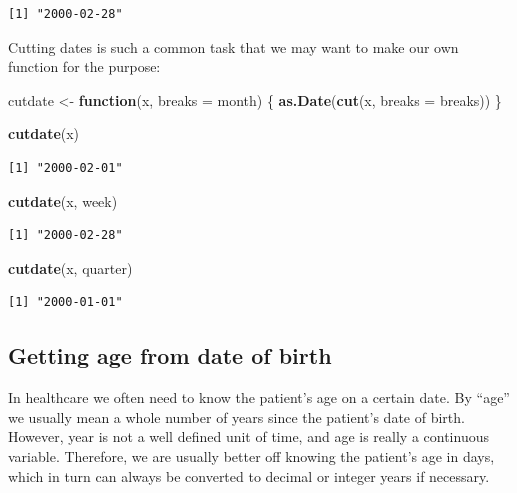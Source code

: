 \documentclass[
]{book}
\newenvironment{Shaded}{\begin{snugshade}}{\end{snugshade}}
\newcommand{\AttributeTok}[1]{\textcolor[rgb]{0.13,0.29,0.53}{#1}}
\newcommand{\ControlFlowTok}[1]{\textcolor[rgb]{0.13,0.29,0.53}{\textbf{#1}}}
\newcommand{\FunctionTok}[1]{\textcolor[rgb]{0.13,0.29,0.53}{\textbf{#1}}}
\newcommand{\NormalTok}[1]{#1}
\newcommand{\OtherTok}[1]{\textcolor[rgb]{0.56,0.35,0.01}{#1}}
\newcommand{\StringTok}[1]{\textcolor[rgb]{0.31,0.60,0.02}{#1}}
\begin{document}
\begin{verbatim}
[1] "2000-02-28"
\end{verbatim}

Cutting dates is such a common task that we may want to make our own function for the purpose:

\begin{Shaded}
\begin{Highlighting}[]
\NormalTok{cutdate }\OtherTok{\textless{}{-}} \ControlFlowTok{function}\NormalTok{(x, }\AttributeTok{breaks =} \StringTok{\textquotesingle{}month\textquotesingle{}}\NormalTok{) \{}
  \FunctionTok{as.Date}\NormalTok{(}\FunctionTok{cut}\NormalTok{(x, }\AttributeTok{breaks =}\NormalTok{ breaks))}
\NormalTok{\}}

\FunctionTok{cutdate}\NormalTok{(x)}
\end{Highlighting}
\end{Shaded}

\begin{verbatim}
[1] "2000-02-01"
\end{verbatim}

\begin{Shaded}
\begin{Highlighting}[]
\FunctionTok{cutdate}\NormalTok{(x, }\StringTok{\textquotesingle{}week\textquotesingle{}}\NormalTok{)}
\end{Highlighting}
\end{Shaded}

\begin{verbatim}
[1] "2000-02-28"
\end{verbatim}

\begin{Shaded}
\begin{Highlighting}[]
\FunctionTok{cutdate}\NormalTok{(x, }\StringTok{\textquotesingle{}quarter\textquotesingle{}}\NormalTok{)}
\end{Highlighting}
\end{Shaded}

\begin{verbatim}
[1] "2000-01-01"
\end{verbatim}

\subsection{Getting age from date of birth}\label{getting-age-from-date-of-birth}

In healthcare we often need to know the patient's age on a certain date. By ``age'' we usually mean a whole number of years since the patient's date of birth. However, year is not a well defined unit of time, and age is really a continuous variable. Therefore, we are usually better off knowing the patient's age in days, which in turn can always be converted to decimal or integer years if necessary.
\end{document}
